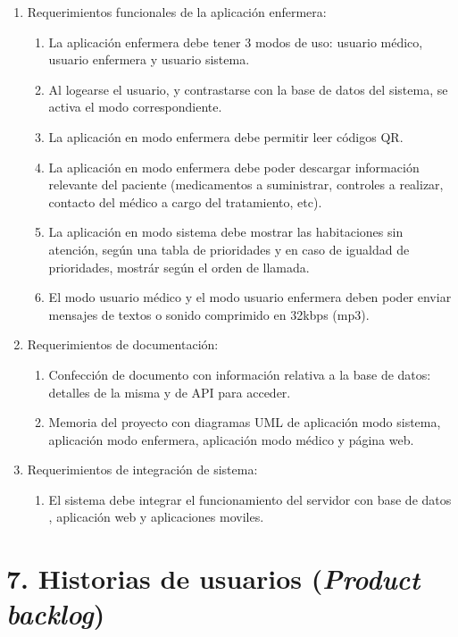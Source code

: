 \documentclass[
11pt, %
]{charter}
\begin{document}
\begin{enumerate}
	
	
	\item Requerimientos funcionales de la aplicación enfermera:
		\begin{enumerate}
			\item La aplicación enfermera debe tener 3 modos de uso: usuario médico, usuario enfermera y usuario sistema.
			\item Al logearse el usuario, y contrastarse con la base de datos del sistema, se activa el modo correspondiente.
			\item La aplicación en modo enfermera debe permitir leer códigos QR.			
			\item La aplicación en modo enfermera debe poder descargar información relevante del paciente (medicamentos a suministrar, controles a realizar, contacto del médico a cargo del tratamiento, etc).	
			\item La aplicación en modo sistema debe mostrar las habitaciones sin atención, según una tabla de prioridades y en caso de igualdad de prioridades, mostrár según el orden de llamada.
			\item El modo usuario médico y el modo usuario enfermera deben poder enviar mensajes de textos o sonido comprimido en 32kbps (mp3).
		\end{enumerate}
		
		
	\item Requerimientos de documentación:
		\begin{enumerate}
			\item Confección de documento con información relativa a la base de datos: detalles de la misma y de API para acceder.
			\item Memoria del proyecto con diagramas UML de aplicación modo sistema, aplicación modo enfermera, aplicación modo médico y página web.
			
		\end{enumerate}
		
		
	\item Requerimientos de integración de sistema:	
			\begin{enumerate}
			\item El sistema debe integrar el funcionamiento del servidor con base de datos , aplicación web y aplicaciones moviles.
			
			\end{enumerate}	
	

\end{enumerate}


\section{7. Historias de usuarios (\textit{Product backlog})}
\label{sec:backlog}
\end{document}
